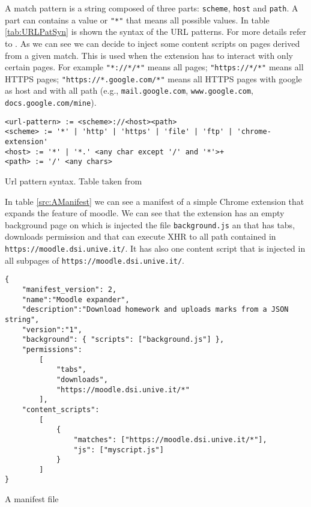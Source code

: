 A match pattern is a string composed of three parts: \texttt{scheme}, \texttt{host} and \texttt{path}. A part can contains a value or \texttt{"*"} that means all possible values. In table \ref{tab:URLPatSyn} is shown the syntax of the URL patterns. For more details refer to \cite{ChromeExtensionMatch}. As we can see we can decide to inject some content scripts on pages derived from a given match. This is used when the extension has to interact with only certain pages. For example \texttt{"*://*/*"} means all pages; \texttt{"https://*/*"} means all HTTPS pages; \texttt{"https://*.google.com/*"} means all HTTPS pages with google as host and with all path (e.g., \texttt{mail.google.com}, \texttt{www.google.com}, \texttt{docs.google.com/mine}).

\begin{table}[tlb]
\begin{verbatim}
<url-pattern> := <scheme>://<host><path>
<scheme> := '*' | 'http' | 'https' | 'file' | 'ftp' | 'chrome-extension'
<host> := '*' | '*.' <any char except '/' and '*'>+
<path> := '/' <any chars>
\end{verbatim}
\caption{Url pattern syntax. Table taken from \cite{ChromeExtensionMatch}}
\label{tab:URLPatSyn}
\end{table}

In table \ref{src:AManifest} we can see a manifest of a simple Chrome extension that expands the feature of moodle. We can see that the extension has an empty background page on which is injected the file \texttt{background.js} an that has tabs, downloads permission and that can execute XHR to all path contained in \texttt{https://moodle.dsi.unive.it/}. It has also one content script that is injected in all subpages of \texttt{https://moodle.dsi.unive.it/}.
\begin{table}[tlb]
\lstset{language=java,showstringspaces=false}
\begin{small}
\begin{lstlisting}
{
	"manifest_version": 2,
	"name":"Moodle expander",
	"description":"Download homework and uploads marks from a JSON string",
	"version":"1",
	"background": { "scripts": ["background.js"] },
	"permissions":  
		[
			"tabs",
			"downloads",
			"https://moodle.dsi.unive.it/*"
		],
	"content_scripts": 
		[
			{
				"matches": ["https://moodle.dsi.unive.it/*"],
				"js": ["myscript.js"]
			}
		]
}
\end{lstlisting}
\end{small}
\caption{A manifest file}
\label{src:AManifest}
\end{table}

